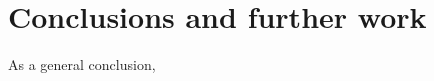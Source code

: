 \chapter{Conclusions and further work} %
\label{cha:conclusions}
As a general conclusion, 









